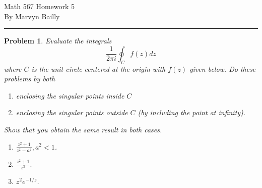\documentclass[12pt]{report}
\newtheorem{problem}{Problem}
\begin{document}
\large

\begin{center}
 Math 567 Homework 5\\
 By Marvyn Bailly\\
\end{center}

\normalsize

\hrule



\begin{problem}
    Evaluate the integrals
    \[\frac{1}{2\pi i} \oint_C f(z) dz\] 
    where $C$ is the unit circle centered at the origin with $f(z)$ given below. Do these problems by both
    \begin{enumerate}
        \item [(i)] enclosing the singular points inside $C$
        \item [(ii)] enclosing the singular points outside $C$ (by including the point at infinity).
    \end{enumerate}
    Show that you obtain the same result in both cases.
    \begin{enumerate}
        \item [(a)] $\frac{z^2 + 1}{z^2 - a^2}, a^2 < 1$.
        \item [(b)] $\frac{z^2 + 1}{z^3}.$
        \item [(c)] $z^2e^{-1/z}$.
    \end{enumerate}
\end{problem}
\end{document}
